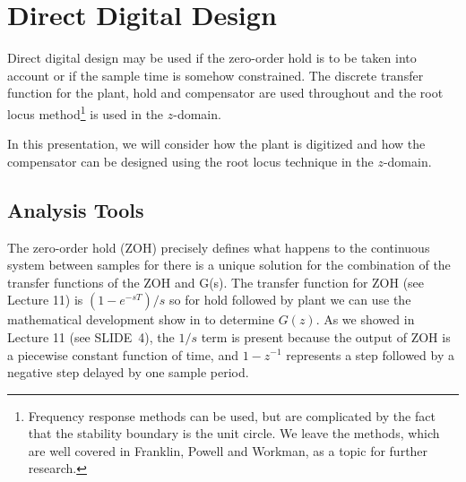 \section*{Direct Digital Design}

Direct digital design may be used if the zero-order hold is to be taken into account or if the sample time is somehow constrained. The discrete transfer function for the plant, hold and compensator are used throughout and the root locus method\footnote{Frequency response methods can be used, but are complicated by the fact that the stability boundary is the unit circle. We leave the methods, which are well covered in Franklin, Powell and Workman, as a topic for further research.} is used in the $z$-domain.

In this presentation, we will consider how the plant is digitized and how the compensator can be designed using the root locus technique in the $z$-domain.

\subsection*{Analysis Tools}

\begin{slide}\label{slides:l12s11}
\end{slide}

\begin{slide}\label{slides:l12s12}
\end{slide}

The zero-order hold (ZOH) precisely defines what happens to the continuous system between samples for there is a unique solution for the combination of the transfer functions of the ZOH and G(s). The transfer function for ZOH  (see Lecture 11) is $(1-e^{-sT})/s$ so for hold followed by plant we can use the mathematical development show in  to determine $G(z)$. As we showed in Lecture 11 (see SLIDE~4), the $1/s$ term is present because the output of ZOH is a piecewise constant function of time, and $1-z^{-1}$ represents a step followed by a negative step delayed by one sample period. 



